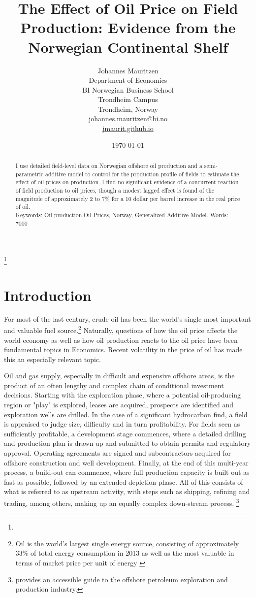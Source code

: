 \documentclass[12pt]{article}
\title{The Effect of Oil Price on Field Production: Evidence from the Norwegian Continental Shelf}
\author{Johannes Mauritzen\\
		Department of Economics\\
        BI Norwegian Business School\\
        Trondheim Campus\\
		Trondheim, Norway\\
        johannes.mauritzen@bi.no\\
        \url{jmaurit.github.io}\\
		}
\date{\today}
\begin{document}
 \begin{spacing}{1} %
	\maketitle

\begin{abstract}
I use detailed field-level data on Norwegian offshore oil production and a semi-parametric additive model to control for the production profile of fields to estimate the effect of oil prices on production.  I find no significant evidence of a concurrent reaction of field production to oil prices, though a modest lagged effect is found of the magnitude of approximately 2 to 7\% for a 10 dollar per barrel increase in the real price of oil.\\
Keywords: Oil production,Oil Prices, Norway, Generalized Additive Model.
Words: 7000
\end{abstract}

\thanks{}
 \end{spacing}

\section{Introduction}

For most of the last century, crude oil has been the world's single most important and valuable fuel source.\footnote{Oil is the world's largest single energy source, consisting of approximately 33\% of total energy consumption in 2013 as well as the most valuable in terms of market price per unit of energy \citep{british_petroleum_statistical_2013}} Naturally, questions of how the oil price affects the world economy as well as how oil production reacts to the oil price have been fundamental topics in Economics. Recent volatility in the price of oil has made this an especially relevant topic. 

Oil and gas supply, especially in difficult and expensive offshore areas, is the product of an often lengthy and complex chain of conditional investment decisions. Starting with the exploration phase, where a potential oil-producing region or "play" is explored, leases are acquired, prospects are identified and exploration wells are drilled. In the case of a significant hydrocarbon find, a field is appraised to judge size, difficulty and in turn profitability. For fields seen as sufficiently profitable, a development stage commences, where a detailed drilling and production plan is drawn up and submitted to obtain permits and regulatory approval. Operating agreements are signed and subcontractors acquired for offshore construction and well development. Finally, at the end of this multi-year process, a build-out can commence, where full production capacity is built out as fast as possible, followed by an extended depletion phase. All of this consists of what is referred to as upstream activity, with steps such as shipping, refining and trading, among others, making up an equally complex down-stream process. \footnote{\citet{lefler_deepwater_2011} provides an accessible guide to the offshore petroleum exploration and production industry.} 
\end{document}
